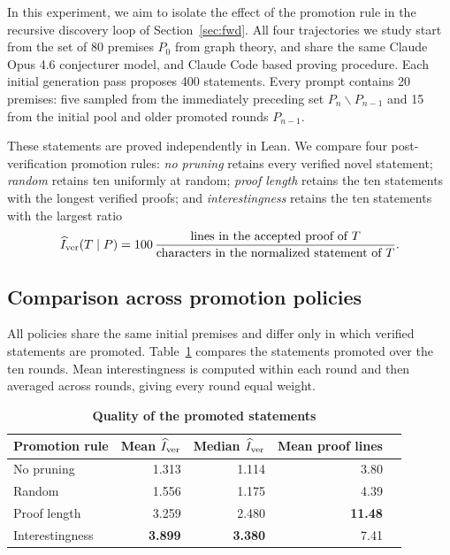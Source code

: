 In this experiment, we aim to isolate the effect of the promotion rule in the recursive discovery loop of
Section~\ref{sec:fwd}. All four trajectories we study start from the set of 80 premises $P_0$ from graph theory, and share the same Claude Opus 4.6 conjecturer model, and Claude Code based proving procedure. 
Each initial generation pass proposes 400 statements. Every prompt contains 20 premises: five sampled from the immediately preceding set $P_n \backslash P_{n-1}$ and 15 from the initial pool and older promoted rounds $P_{n-1}$.

These statements are proved independently in Lean. We compare four post-verification promotion rules: \emph{no pruning} retains every verified novel statement; \emph{random} retains ten uniformly at random; \emph{proof length} retains the ten statements with the longest verified proofs; and \emph{interestingness} retains the ten statements with the largest ratio
\begin{equation}
  \widehat I_{\rm ver}(T\mid P)
    =100\,\frac{\text{lines in the accepted proof of }T}
                    {\text{characters in the normalized statement of }T}.
  \label{eq:verified-forward-interestingness}
\end{equation}

\subsection{Comparison across promotion policies}

All policies share the same initial premises and differ only in which verified statements are promoted. Table~\ref{tab:forward-pruning-primary} compares the statements promoted over
the ten rounds. Mean interestingness is computed within each round and then
averaged across rounds, giving every round equal weight.

\begin{table}[H]
  \centering
  \small
  \begin{tabular}{@{}lrrrr@{}}
    \toprule
    Promotion rule  & Mean $\widehat I_{\rm ver}$ & Median $\widehat I_{\rm ver}$ & Mean proof lines \\
    \midrule
    No pruning       & 1.313 & 1.114 & 3.80 \\
    Random           & 1.556 & 1.175 & 4.39 \\
    Proof length     & 3.259 & 2.480 & \textbf{11.48} \\
    Interestingness  & \textbf{3.899} & \textbf{3.380} & 7.41 \\
    \bottomrule
  \end{tabular}
  \caption{\textbf{Quality of the promoted statements}}
  \label{tab:forward-pruning-primary}
\end{table}

